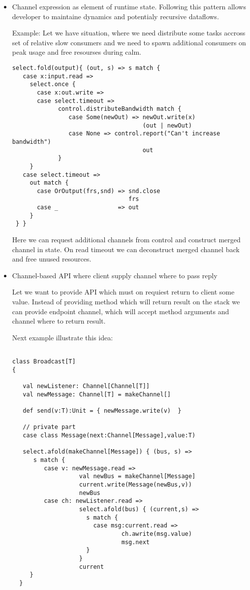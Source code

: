 \documentclass[12pt]{article}
\begin{document}
\begin{itemize}
 \item Channel expression as element of runtime state. Following this pattern allows developer to maintaine dynamics and potentialy recursive dataflows. 
 
 Example: 
  Let we have situation, where we need distribute some tasks accross set of relative slow consumers and we need to spawn additional consumers on peak usage and free resourses during calm. 

\begin{Verbatim}[fontsize=\small]
 select.fold(output){ (out, s) => s match {
   case x:input.read =>
     select.once {
       case x:out.write =>
       case select.timeout =>
             control.distributeBandwidth match {
                case Some(newOut) => newOut.write(x)
                                     (out | newOut)
                case None => control.report("Can't increase bandwidth")
                                     out
             }
     }
   case select.timeout =>
     out match {
       case OrOutput(frs,snd) => snd.close
                                 frs
       case _                 => out
     }
 } }
\end{Verbatim}

 Here we can request additional channels from control and construct merged channel in state. On read timeout we can deconstruct merged channel back and free unused resources.

\item{ Channel-based API where client supply channel where to pass reply }

Let we want to provide API which must on requiest return to client some value. Instead of providing method which will return result on the stack we can provide endpoint channel, which will accept method arguments and channel where to return result. 

 Next example illustrate this idea:

\begin{Verbatim}[fontsize=\small]

class Broadcast[T]
{

   val newListener: Channel[Channel[T]]
   val newMessage: Channel[T] = makeChannel[]

   def send(v:T):Unit = { newMessage.write(v)  }

   // private part
   case class Message(next:Channel[Message],value:T)

   select.afold(makeChannel[Message]) { (bus, s) =>
      s match {
         case v: newMessage.read =>
                   val newBus = makeChannel[Message]
                   current.write(Message(newBus,v))
                   newBus
         case ch: newListener.read =>          
                   select.afold(bus) { (current,s) =>
                     s match {
                       case msg:current.read =>
                               ch.awrite(msg.value) 
                               msg.next
                     }
                   } 
                   current
     } 
  }


\end{Verbatim}
\end{itemize}
\end{document}

